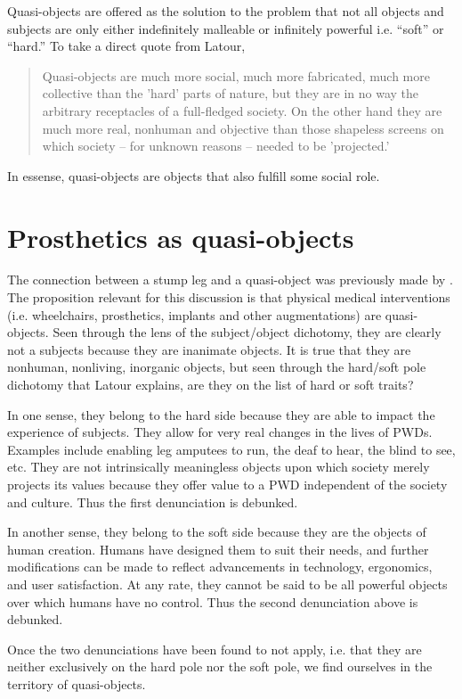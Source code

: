\documentclass[a4paper]{article}
\begin{document}
\begin{appendices}
Quasi-objects are offered as the solution to the problem that not all objects
and subjects are only either indefinitely malleable or infinitely powerful
i.e. ``soft'' or ``hard.'' To take a direct quote from Latour,
%
\begin{quote}
Quasi-objects are much more social, much more fabricated, much more
collective than the 'hard' parts of nature, but they are in no way the
arbitrary receptacles of a full-fledged society. On the other hand they are
much more real, nonhuman and objective than those shapeless screens on which
society – for unknown reasons – needed to be 'projected.' \citep{latour2012we}
\end{quote}
%
In essense, quasi-objects are objects that also fulfill some social role.


\newpage
\section{Prosthetics as quasi-objects}
\label{pros-quasi}

The connection between a stump leg and a quasi-object was previously made by
\cite{bertram2018bestial}. The proposition relevant for this discussion is
that physical medical interventions (i.e. wheelchairs, prosthetics, implants
and other augmentations) are quasi-objects. Seen through the lens of the
subject/object dichotomy, they are clearly not a subjects because they are
inanimate objects. It is true that they are nonhuman, nonliving, inorganic
objects, but seen through the hard/soft pole dichotomy that Latour explains,
are they on the list of hard or soft traits?

In one sense, they belong to the hard side because they are able to impact the
experience of subjects. They allow for very real changes in the lives of PWDs.
Examples include enabling leg amputees to run, the deaf to hear, the blind to
see, etc. They are not intrinsically meaningless objects upon which society
merely projects its values because they offer value to a PWD independent of
the society and culture. Thus the first denunciation is debunked.

In another sense, they belong to the soft side because they are the objects of
human creation. Humans have designed them to suit their needs, and further
modifications can be made to reflect advancements in technology, ergonomics,
and user satisfaction. At any rate, they cannot be said to be all powerful
objects over which humans have no control. Thus the second denunciation above
is debunked.

Once the two denunciations have been found to not apply, i.e. that they are
neither exclusively on the hard pole nor the soft pole, we find ourselves in
the territory of quasi-objects.

\end{appendices}
\end{document}
